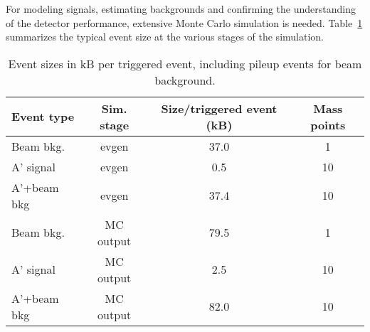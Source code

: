 For modeling signals, estimating backgrounds and confirming the understanding of the detector 
performance, extensive Monte Carlo simulation is needed. Table~\ref{tab:mc_event_size} summarizes 
the typical event size at the various stages of the simulation. 
\begin{table}[]
\centering
\begin{tabular}{|lccc|}
\hline
Event type & Sim. stage & Size/triggered event (kB) & Mass points  \\
\hline
Beam bkg.  & evgen	& 37.0	& 1	\\
A' signal & evgen	& 0.5	& 10	\\
A'+beam bkg & evgen	& 37.4	& 10	\\
\hline
Beam bkg.  & MC output	& 79.5	& 1	\\
A' signal & MC output	& 2.5	& 10	\\
A'+beam bkg & MC output	& 82.0	& 10	\\
\hline
\end{tabular}
\caption{{\small Event sizes in kB per triggered event, including pileup events for beam background. }}
\label{tab:mc_event_size}
\end{table}

